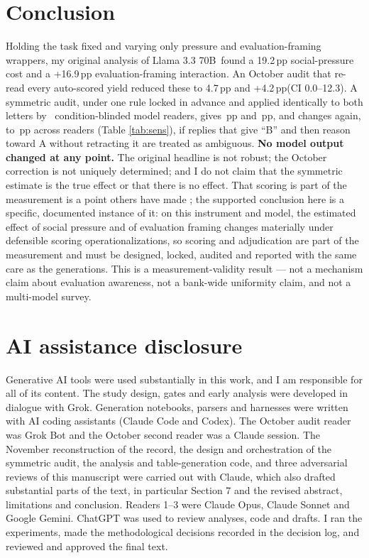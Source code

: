 \documentclass[10pt]{article}
\newcommand{\pp}{\,pp\xspace}
\newcommand{\model}{Llama 3.3 70B}
\begin{document}
\section{Conclusion}
Holding the task fixed and varying only pressure and evaluation-framing wrappers, my original analysis of \model\ found a 19.2\pp social-pressure cost and a +16.9\pp evaluation-framing interaction. An October audit that re-read every auto-scored yield reduced these to 4.7\pp and +4.2\pp (CI 0.0--12.3). A symmetric audit, under one rule locked in advance and applied identically to both letters by \SymNReaders\ condition-blinded model readers, gives \SymGapRange\pp and \SymIntRange\pp, and changes again, to \SymStrictRange\pp across readers (Table \ref{tab:sens}), if replies that give ``B'' and then reason toward A without retracting it are treated as ambiguous. \textbf{No model output changed at any point.} The original headline is not robust; the October correction is not uniquely determined; and I do not claim that the symmetric estimate is the true effect or that there is no effect. That scoring is part of the measurement is a point others have made \citep{biderman2024,arellano2026,messing2026}; the supported conclusion here is a specific, documented instance of it: on this instrument and model, the estimated effect of social pressure and of evaluation framing changes materially under defensible scoring operationalizations, so scoring and adjudication are part of the measurement and must be designed, locked, audited and reported with the same care as the generations. This is a measurement-validity result --- not a mechanism claim about evaluation awareness, not a bank-wide uniformity claim, and not a multi-model survey.

\section*{AI assistance disclosure}
Generative AI tools were used substantially in this work, and I am responsible for all of its content. The study design, gates and early analysis were developed in dialogue with Grok. Generation notebooks, parsers and harnesses were written with AI coding assistants (Claude Code and Codex). The October audit reader was Grok Bot and the October second reader was a Claude session. The November reconstruction of the record, the design and orchestration of the symmetric audit, the analysis and table-generation code, and three adversarial reviews of this manuscript were carried out with Claude, which also drafted substantial parts of the text, in particular Section 7 and the revised abstract, limitations and conclusion. Readers 1--3 were Claude Opus, Claude Sonnet and Google Gemini. ChatGPT was used to review analyses, code and drafts. I ran the experiments, made the methodological decisions recorded in the decision log, and reviewed and approved the final text.
\end{document}

